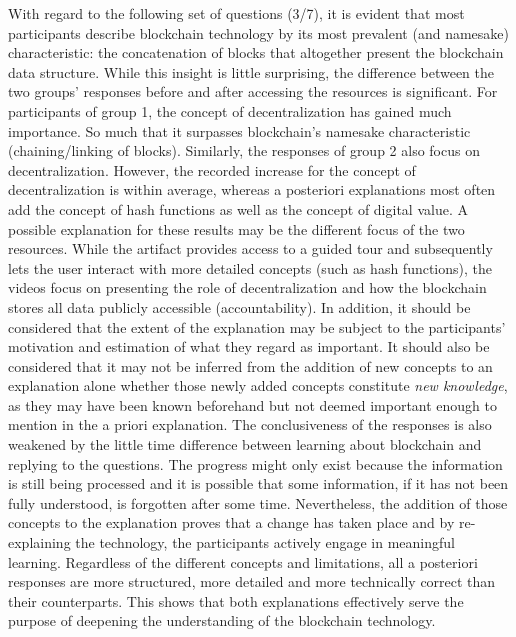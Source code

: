 With regard to the following set of questions (3/7), it is evident that most participants describe blockchain technology by its most prevalent (and namesake) characteristic: the concatenation of blocks that altogether present the blockchain data structure. While this insight is little surprising, the difference between the two groups' responses before and after accessing the resources is significant. For participants of group 1, the concept of decentralization has gained much importance. So much that it surpasses blockchain's namesake characteristic (chaining/linking of blocks). Similarly, the responses of group 2 also focus on decentralization. However, the recorded increase for the concept of decentralization is within average, whereas a posteriori explanations most often add the concept of hash functions as well as the concept of digital value. A possible explanation for these results may be the different focus of the two resources. While the artifact provides access to a guided tour and subsequently lets the user interact with more detailed concepts (such as hash functions), the videos focus on presenting the role of decentralization and how the blockchain stores all data publicly accessible (accountability). In addition, it should be considered that the extent of the explanation may be subject to the participants' motivation and estimation of what they regard as important. It should also be considered that it may not be inferred from the addition of new concepts to an explanation alone whether those newly added concepts constitute \textit{new knowledge}, as they may have been known beforehand but not deemed important enough to mention in the a priori explanation. The conclusiveness of the responses is also weakened by the little time difference between learning about blockchain and replying to the questions. The progress might only exist because the information is still being processed and it is possible that some information, if it has not been fully understood, is forgotten after some time. Nevertheless, the addition of those concepts to the explanation proves that a change has taken place and by re-explaining the technology, the participants actively engage in meaningful learning. Regardless of the different concepts and limitations, all a posteriori responses are more structured, more detailed and more technically correct than their counterparts. This shows that both explanations effectively serve the purpose of deepening the understanding of the blockchain technology. 

